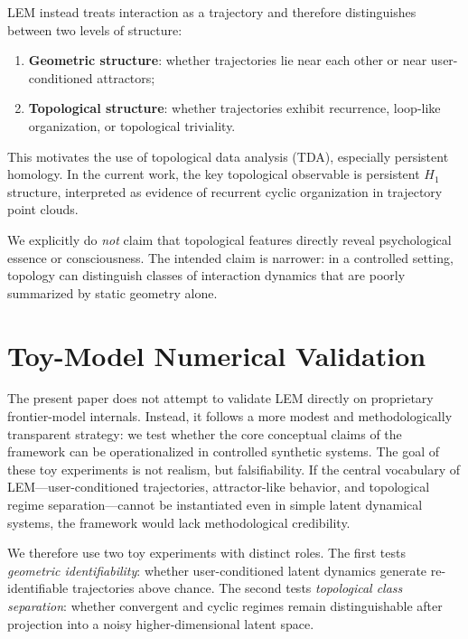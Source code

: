 \documentclass[11pt]{article}
\begin{document}
LEM instead treats interaction as a trajectory and therefore
distinguishes between two levels of structure:
\begin{enumerate}[leftmargin=1.5em]
  \item \textbf{Geometric structure}: whether trajectories
        lie near each other or near user-conditioned
        attractors;
  \item \textbf{Topological structure}: whether trajectories
        exhibit recurrence, loop-like organization, or
        topological triviality.
\end{enumerate}

This motivates the use of topological data analysis (TDA),
especially persistent homology. In the current work, the key
topological observable is persistent $H_1$ structure,
interpreted as evidence of recurrent cyclic organization in
trajectory point clouds.

We explicitly do \emph{not} claim that topological features
directly reveal psychological essence or consciousness. The
intended claim is narrower: in a controlled setting, topology
can distinguish classes of interaction dynamics that are
poorly summarized by static geometry alone.


\section{Toy-Model Numerical Validation}

The present paper does not attempt to validate LEM directly
on proprietary frontier-model internals. Instead, it follows
a more modest and methodologically transparent strategy: we
test whether the core conceptual claims of the framework can
be operationalized in controlled synthetic systems. The goal
of these toy experiments is not realism, but falsifiability.
If the central vocabulary of LEM---user-conditioned
trajectories, attractor-like behavior, and topological regime
separation---cannot be instantiated even in simple latent
dynamical systems, the framework would lack methodological
credibility.

We therefore use two toy experiments with distinct roles. The
first tests \emph{geometric identifiability}: whether
user-conditioned latent dynamics generate re-identifiable
trajectories above chance. The second tests
\emph{topological class separation}: whether convergent and
cyclic regimes remain distinguishable after projection into a
noisy higher-dimensional latent space.
\end{document}
